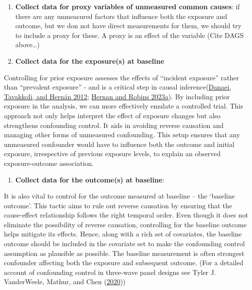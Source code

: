 \documentclass[
  singlecolumn]{report}
\providecommand{\tightlist}{%
  \setlength{\itemsep}{0pt}\setlength{\parskip}{0pt}}\usepackage{longtable,booktabs,array}
\begin{document}
\begin{enumerate}
\def\labelenumi{\arabic{enumi}.}
\setcounter{enumi}{5}
\item
  \textbf{Collect data for proxy variables of unmeasured common causes}:
  if there are any unmeasured factors that influence both the exposure
  and outcome, but we don not have direct measurements for them, we
  should try to include a proxy for these. A proxy is an effect of the
  variable (Cite DAGS above\ldots)
\item
  \textbf{Collect data for the exposure(s) at baseline}
\end{enumerate}

Controlling for prior exposure assesses the effects of ``incident
exposure'' rather than ``prevalent exposure'' - and is a critical step
in causal inference(\protect\hyperlink{ref-danaei2012}{Danaei,
Tavakkoli, and Hernán 2012}; \protect\hyperlink{ref-hernan2023}{Hernan
and Robins 2023a}). By including prior exposure in the analysis, we can
more effectively emulate a controlled trial. This approach not only
helps interpret the effect of exposure changes but also strengthens
confounding control. It aids in avoiding reverse causation and managing
other forms of unmeasured confounding. This setup ensures that any
unmeasured confounder would have to influence both the outcome and
initial exposure, irrespective of previous exposure levels, to explain
an observed exposure-outcome association.

\begin{enumerate}
\def\labelenumi{\arabic{enumi}.}
\setcounter{enumi}{7}
\tightlist
\item
  \textbf{Collect data for the outcome(s) at baseline}:
\end{enumerate}

It is also vital to control for the outcome measured at baseline -- the
`baseline outcome'. This tactic aims to rule out reverse causation by
ensuring that the cause-effect relationship follows the right temporal
order. Even though it does not eliminate the possibility of reverse
causation, controlling for the baseline outcome helps mitigate its
effects. Hence, along with a rich set of covariates, the baseline
outcome should be included in the covariate set to make the confounding
control assumption as plausible as possible. The baseline measurement is
often strongest confounder affecting both the exposure and subsequent
outcome. (For a detailed account of confounding control in three-wave
panel designs see Tyler J. VanderWeele, Mathur, and Chen
(\protect\hyperlink{ref-vanderweele2020}{2020}))
\end{document}
